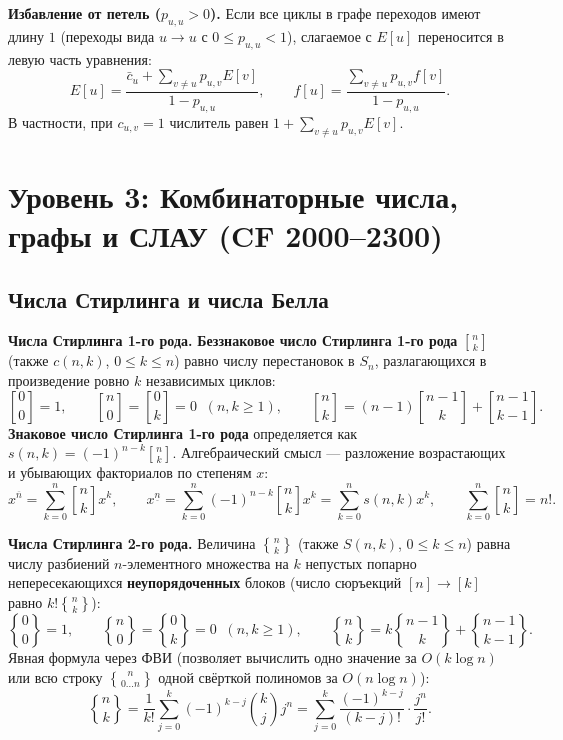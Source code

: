 \documentclass[10pt,a4paper]{article}
\renewcommand{\le}{\leqslant}
\renewcommand{\ge}{\geqslant}
\newcommand{\fall}[2]{#1^{\underline{#2}}}
\newcommand{\rise}[2]{#1^{\overline{#2}}}
\newcommand{\stirlingfirst}[2]{\genfrac{[}{]}{0pt}{}{#1}{#2}}
\newcommand{\stirlingsecond}[2]{\genfrac{\{}{\}}{0pt}{}{#1}{#2}}
\begin{document}
\textbf{Избавление от петель ($p_{u,u} > 0$).} Если все циклы в графе переходов имеют длину $1$ (переходы вида $u \to u$ с $0 \le p_{u,u} < 1$), слагаемое с $E[u]$ переносится в левую часть уравнения:
\[
  E[u] = \frac{\bar{c}_u + \sum_{v \ne u} p_{u,v} E[v]}{1 - p_{u,u}}, \qquad
  f[u] = \frac{\sum_{v \ne u} p_{u,v} f[v]}{1 - p_{u,u}}.
\]
В частности, при $c_{u,v} = 1$ числитель равен $1 + \sum_{v \ne u} p_{u,v} E[v]$.

\section{Уровень 3: Комбинаторные числа, графы и СЛАУ (CF 2000--2300)}

\subsection{Числа Стирлинга и числа Белла}

\textbf{Числа Стирлинга 1-го рода.} \textbf{Беззнаковое число Стирлинга 1-го рода} $\stirlingfirst{n}{k}$ (также $c(n, k)$, $0 \le k \le n$) равно числу перестановок в $S_n$, разлагающихся в произведение ровно $k$ независимых циклов:
\[
  \stirlingfirst{0}{0} = 1, \qquad \stirlingfirst{n}{0} = \stirlingfirst{0}{k} = 0 \;\;(n, k \ge 1), \qquad
  \stirlingfirst{n}{k} = (n - 1)\stirlingfirst{n - 1}{k} + \stirlingfirst{n - 1}{k - 1}.
\]
\textbf{Знаковое число Стирлинга 1-го рода} определяется как $s(n, k) = (-1)^{n - k}\stirlingfirst{n}{k}$. Алгебраический смысл — разложение возрастающих и убывающих факториалов по степеням $x$:
\[
  \rise{x}{n} = \sum_{k=0}^{n} \stirlingfirst{n}{k} x^k, \qquad
  \fall{x}{n} = \sum_{k=0}^{n} (-1)^{n - k} \stirlingfirst{n}{k} x^k = \sum_{k=0}^{n} s(n, k) x^k, \qquad
  \sum_{k=0}^{n} \stirlingfirst{n}{k} = n!.
\]

\textbf{Числа Стирлинга 2-го рода.} Величина $\stirlingsecond{n}{k}$ (также $S(n, k)$, $0 \le k \le n$) равна числу разбиений $n$-элементного множества на $k$ непустых попарно непересекающихся \textbf{неупорядоченных} блоков (число сюръекций $[n] \to [k]$ равно $k! \stirlingsecond{n}{k}$):
\[
  \stirlingsecond{0}{0} = 1, \qquad \stirlingsecond{n}{0} = \stirlingsecond{0}{k} = 0 \;\;(n, k \ge 1), \qquad
  \stirlingsecond{n}{k} = k\stirlingsecond{n - 1}{k} + \stirlingsecond{n - 1}{k - 1}.
\]
Явная формула через ФВИ (позволяет вычислить одно значение за $O(k \log n)$ или всю строку $\stirlingsecond{n}{0 \dots n}$ одной свёрткой полиномов за $O(n \log n)$):
\[
  \stirlingsecond{n}{k} = \frac{1}{k!} \sum_{j=0}^{k} (-1)^{k - j} \binom{k}{j} j^n = \sum_{j=0}^{k} \frac{(-1)^{k - j}}{(k - j)!} \cdot \frac{j^n}{j!}.
\]
\end{document}
